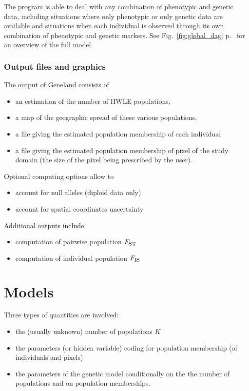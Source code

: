 \documentclass{article}
\newcommand{\Fst}{F_{\mbox{\footnotesize ST}}}
\newcommand{\Fis}{F_{\mbox{\footnotesize IS}}}
\begin{document}
The program is able to deal with any combination of  phenotypic and genetic data, 
including situations where only phenotypic or only genetic data are available 
and situations when each individual is observed through its own combination of phenotypic and genetic markers. 
See Fig.~\ref{fig:global_dag} p.~\pageref{fig:global_dag} for an overview of the full model. 


\subsubsection{Output files and graphics}

The output of {\sc Geneland} consists of 
\begin{itemize}
\item an estimation of the number of HWLE populations, 
\item a map of the geographic spread of these various populations, 
\item a file giving  the estimated population membership of each individual
\item a file giving  the estimated population membership of pixel of the study domain (the size of the pixel 
being prescribed by the user).
\end{itemize}

Optional computing options allow to 
\begin{itemize}
\item account for null alleles (diploid data only)
\item account for spatial coordinates uncertainty
\end{itemize}

Additional outputs include
\begin{itemize}
\item computation of pairwise population $\Fst$
\item computation of individual population $\Fis$
\end{itemize}

\section{Models}\label{sec:models}

Three types of quantities are involved:
\begin{itemize}
\item  the (usually unknown) number of populations $K$ 
\item the parameters (or hidden variable) coding for population membership (of individuals and pixels)
\item the parameters of the genetic model conditionally on the the number of populations and on 
population memberships.
 \end{itemize}
\end{document}
